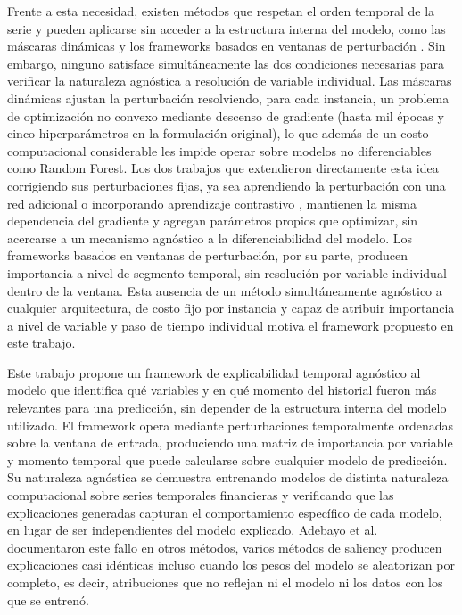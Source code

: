 \documentclass[conference, letterpaper]{IEEEtran}
\begin{document}
Frente a esta necesidad, existen métodos que respetan el orden temporal de la serie y pueden aplicarse sin acceder a la estructura interna del modelo, como las máscaras dinámicas \cite{crabbe2021} y los frameworks basados en ventanas de perturbación \cite{roshinta2026}. Sin embargo, ninguno satisface simultáneamente las dos condiciones necesarias para verificar la naturaleza agnóstica a resolución de variable individual. Las máscaras dinámicas ajustan la perturbación resolviendo, para cada instancia, un problema de optimización no convexo mediante descenso de gradiente (hasta mil épocas y cinco hiperparámetros en la formulación original), lo que además de un costo computacional considerable les impide operar sobre modelos no diferenciables como Random Forest. Los dos trabajos que extendieron directamente esta idea corrigiendo sus perturbaciones fijas, ya sea aprendiendo la perturbación con una red adicional \cite{enguehard2023} o incorporando aprendizaje contrastivo \cite{liu2024contralsp}, mantienen la misma dependencia del gradiente y agregan parámetros propios que optimizar, sin acercarse a un mecanismo agnóstico a la diferenciabilidad del modelo. Los frameworks basados en ventanas de perturbación, por su parte, producen importancia a nivel de segmento temporal, sin resolución por variable individual dentro de la ventana. Esta ausencia de un método simultáneamente agnóstico a cualquier arquitectura, de costo fijo por instancia y capaz de atribuir importancia a nivel de variable y paso de tiempo individual motiva el framework propuesto en este trabajo.

Este trabajo propone un framework de explicabilidad temporal agnóstico al modelo que identifica qué variables y en qué momento del historial fueron más relevantes para una predicción, sin depender de la estructura interna del modelo utilizado. El framework opera mediante perturbaciones temporalmente ordenadas sobre la ventana de entrada, produciendo una matriz de importancia por variable y momento temporal que puede calcularse sobre cualquier modelo de predicción. Su naturaleza agnóstica se demuestra entrenando modelos de distinta naturaleza computacional sobre series temporales financieras y verificando que las explicaciones generadas capturan el comportamiento específico de cada modelo, en lugar de ser independientes del modelo explicado. Adebayo et al.~\cite{adebayo2018} documentaron este fallo en otros métodos, varios métodos de saliency producen explicaciones casi idénticas incluso cuando los pesos del modelo se aleatorizan por completo, es decir, atribuciones que no reflejan ni el modelo ni los datos con los que se entrenó.
\end{document}
